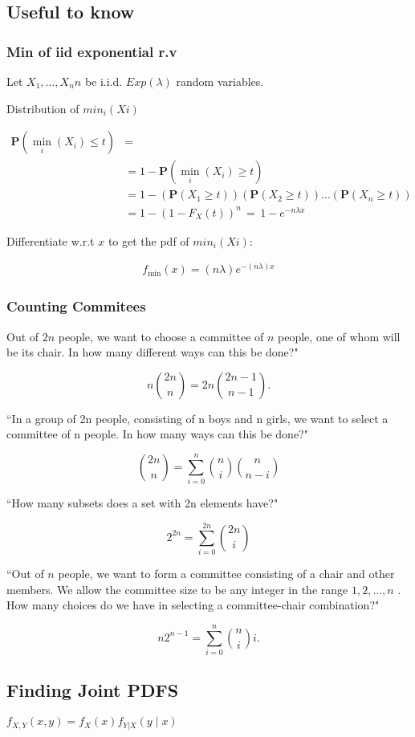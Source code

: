\subsection{Useful to know}

\subsubsection{Min of iid exponential r.v}
Let  $X_1,…,X_nn$  be i.i.d. $Exp(\lambda)$ random variables.

Distribution of $min_i(Xi)$ 

\begin{align*}
   \mathbf{P}(\min _ i (X_ i)\leq t) &=\\
&=1-\mathbf{P}(\min _ i (X_ i)\geq t)\\
&=1-(\mathbf{P}(X_1\geq t))(\mathbf{P}(X_2\geq t))\ldots (\mathbf{P}(X_ n\geq t))\\
&=1-(1-F_ X(t))^ n \, =\, 1-e^{-n\lambda x}
\end{align*}

Differentiate w.r.t $x$ to get the pdf of $min_i(Xi)$:

\begin{align*}
f_{\text {min}}(x)= (n\lambda ) e^{-(n\lambda ) x}
\end{align*}

\subsubsection{Counting Commitees}

Out of  $2n$  people, we want to choose a committee of $n$ people, one of whom will be its chair. In how many different ways can this be done?" 

$$n\binom {2n}{n}=2n\binom {2n-1}{n-1}.$$

“In a group of  2n  people, consisting of  n  boys and  n  girls, we want to select a committee of  n  people. In how many ways can this be done?"

$$\binom {2n}{n}=\sum _{i=0}^ n \binom {n}{i}\binom {n}{n-i}$$

“How many subsets does a set with  2n  elements have?" 

$$2^{2n}=\sum _{i=0}^{2n}\binom {2n}{i}$$

“Out of  $n$  people, we want to form a committee consisting of a chair and other members. We allow the committee size to be any integer in the range  $1,2,…,n$ . How many choices do we have in selecting a committee-chair combination?"

$$n2^{n-1}=\sum _{i=0}^ n \binom {n}{i}i.$$

\subsection{Finding Joint PDFS}

$f_{X,Y}(x,y)=f_ X(x)f_{Y|X}(y\mid x)$